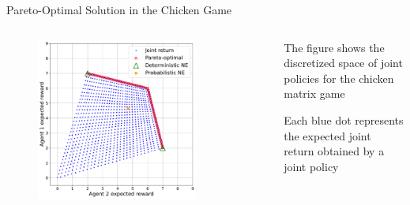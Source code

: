 \begin{frame}{Pareto-Optimal Solution in the Chicken Game}

\begin{columns}
    \begin{column}{0.5\textwidth}
        \begin{figure}
        \centering
        \includegraphics[width=0.8\textwidth, height = 0.8\textheight, keepaspectratio]{images/chapter_4/chicken-po-frontier.pdf}
    \end{figure}
    \end{column}
    \begin{column}{0.5\textwidth}
        \centering
        \vspace{10pt}
        \gamechicken 
        \vspace{10pt}
        \blist
            \item The figure shows the discretized space of joint policies for the chicken matrix game
            \item Each blue dot represents the expected joint return obtained by a joint policy
        \elist
    \end{column}
\end{columns}

\end{frame}

